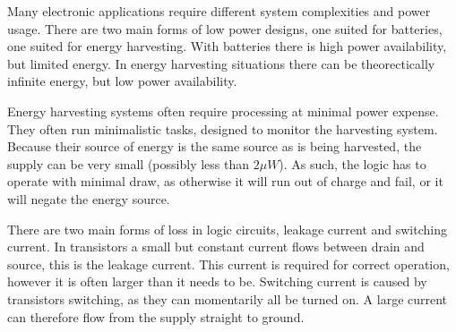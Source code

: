 Many electronic applications require different system complexities and power usage.
There are two main forms of low power designs, one suited for batteries, one suited for energy harvesting.
With batteries there is high power availability, but limited energy.
In energy harvesting situations there can be theorectically infinite energy, but low power availability.

Energy harvesting systems often require processing at minimal power expense.
They often run minimalistic tasks, designed to monitor the harvesting system.
Because their source of energy is the same source as is being harvested, the supply can be very small (possibly less than $2\mu W$).
As such, the logic has to operate with minimal draw, as otherwise it will run out of charge and fail, or it will negate the energy source.

There are two main forms of loss in logic circuits, leakage current and switching current.
In transistors a small but constant current flows between drain and source, this is the leakage current.
This current is required for correct operation, however it is often larger than it needs to be.
Switching current is caused by transistors switching, as they can momentarily all be turned on.
A large current can therefore flow from the supply straight to ground.
